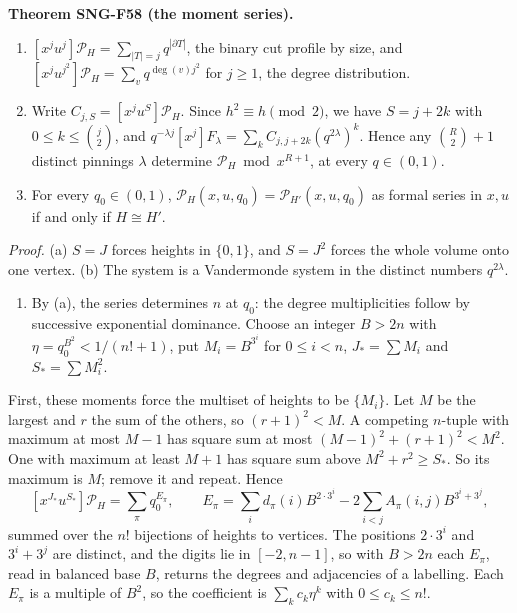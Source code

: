 \documentclass[
  11pt,
  a4paper,
]{report}
\providecommand{\tightlist}{%
  \setlength{\itemsep}{0pt}\setlength{\parskip}{0pt}}
\begin{document}
\textbf{Theorem SNG-F58 (the moment series).}

\begin{enumerate}
\def\labelenumi{(\alph{enumi})}
\item
  \([x^ju^j]\mathcal P_H=\sum_{|T|=j}q^{|\partial T|}\), the binary cut
  profile by size, and \([x^ju^{j^2}]\mathcal P_H=\sum_vq^{\deg(v)j^2}\)
  for \(j\ge1\), the degree distribution.
\item
  Write \(C_{j,S}=[x^ju^S]\mathcal P_H\). Since \(h^2\equiv h\pmod2\),
  we have \(S=j+2k\) with \(0\le k\le\binom j2\), and
  \(q^{-\lambda j}[x^j]F_\lambda=\sum_kC_{j,j+2k}(q^{2\lambda})^k\).
  Hence any \(\binom R2+1\) distinct pinnings \(\lambda\) determine
  \(\mathcal P_H\bmod x^{R+1}\), at every \(q\in(0,1)\).
\item
  For every \(q_0\in(0,1)\),
  \(\mathcal P_H(x,u,q_0)=\mathcal P_{H'}(x,u,q_0)\) as formal series in
  \(x,u\) if and only if \(H\cong H'\).
\end{enumerate}

\emph{Proof.} (a) \(S=J\) forces heights in \(\{0,1\}\), and \(S=J^2\)
forces the whole volume onto one vertex. (b) The system is a Vandermonde
system in the distinct numbers \(q^{2\lambda}\).

\begin{enumerate}
\def\labelenumi{(\alph{enumi})}
\setcounter{enumi}{2}
\tightlist
\item
  By (a), the series determines \(n\) at \(q_0\): the degree
  multiplicities follow by successive exponential dominance. Choose an
  integer \(B>2n\) with \(\eta=q_0^{B^2}<1/(n!+1)\), put \(M_i=B^{3^i}\)
  for \(0\le i<n\), \(J_*=\sum M_i\) and \(S_*=\sum M_i^2\).
\end{enumerate}

First, these moments force the multiset of heights to be \(\{M_i\}\).
Let \(M\) be the largest and \(r\) the sum of the others, so
\((r+1)^2<M\). A competing \(n\)-tuple with maximum at most \(M-1\) has
square sum at most \((M-1)^2+(r+1)^2<M^2\). One with maximum at least
\(M+1\) has square sum above \(M^2+r^2\ge S_*\). So its maximum is
\(M\); remove it and repeat. Hence \[
[x^{J_*}u^{S_*}]\mathcal P_H=\sum_{\pi}q_0^{E_\pi},\qquad E_\pi=\sum_id_\pi(i)B^{2\cdot3^i}-2\sum_{i<j}A_\pi(i,j)B^{3^i+3^j},
\] summed over the \(n!\) bijections of heights to vertices. The
positions \(2\cdot3^i\) and \(3^i+3^j\) are distinct, and the digits lie
in \([-2,n-1]\), so with \(B>2n\) each \(E_\pi\), read in balanced base
\(B\), returns the degrees and adjacencies of a labelling. Each
\(E_\pi\) is a multiple of \(B^2\), so the coefficient is
\(\sum_kc_k\eta^k\) with \(0\le c_k\le n!\).
\end{document}
